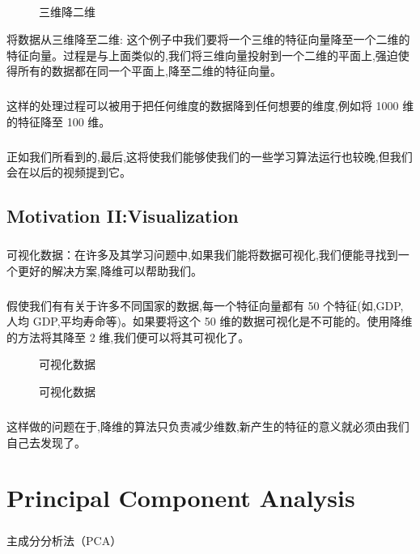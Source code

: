 \documentclass{article}
\begin{document}
\begin{CJK}{UTF8}{gbsn}
\begin{figure}[H]
\end{figure}
\subparagraph{}
\begin{figure}[H]
\label{fig:833}
\caption{三维降二维}
\end{figure}
将数据从三维降至二维: 这个例子中我们要将一个三维的特征向量降至一个二维的特征向量。过程是与上面类似的,我们将三维向量投射到一个二维的平面上,强迫使得所有的数据都在同一个平面上,降至二维的特征向量。
\subparagraph{}
这样的处理过程可以被用于把任何维度的数据降到任何想要的维度,例如将 1000 维的特征降至 100 维。
\begin{figure}[H]
\label{fig:834}
\end{figure}
\subparagraph{}
正如我们所看到的,最后,这将使我们能够使我们的一些学习算法运行也较晚,但我们会在以后的视频提到它。
\subsection{Motivation II:Visualization}
\subparagraph{}
可视化数据：在许多及其学习问题中,如果我们能将数据可视化,我们便能寻找到一个更好的解决方案,降维可以帮助我们。
\subparagraph{}
\begin{figure}[H]
\label{fig:835}
\end{figure}
假使我们有有关于许多不同国家的数据,每一个特征向量都有 50 个特征(如,GDP,人均 GDP,平均寿命等)。如果要将这个 50 维的数据可视化是不可能的。使用降维的方法将其降至 2 维,我们便可以将其可视化了。
\begin{figure}[H]
\label{fig:836}
\caption{可视化数据}
\end{figure}
\begin{figure}[H]
\label{fig:837}
\caption{可视化数据}
\end{figure}
\subparagraph{}
这样做的问题在于,降维的算法只负责减少维数,新产生的特征的意义就必须由我们自己去发现了。
\begin{figure}[H]
\label{fig:838}
\end{figure}
\section{Principal Component Analysis}
\subparagraph{}
主成分分析法（PCA）

\end{CJK}
\end{document}
